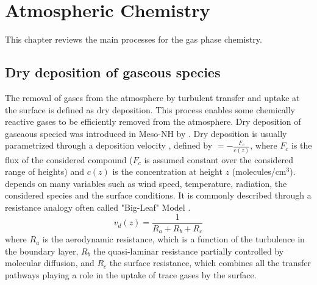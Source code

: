 %
%
%
\chapter{Atmospheric Chemistry}
\minitoc
%
This chapter reviews the main processes for the gas phase chemistry.

\section{Dry deposition of gaseous species}

The removal of gases from the atmosphere by turbulent transfer and uptake at
the surface is defined as dry deposition. This process enables some
chemically reactive gases to be efficiently removed from the atmosphere. 
Dry deposition of gaseaous specied was introduced in Meso-NH by 
\citet{Tulet2003}.
Dry deposition is usually parametrized through a deposition velocity \vd,
defined by \vd$=-\frac{F_c}{c(z)}$, where $F_c$ is the flux of the considered
compound ($F_c$ is assumed constant over the considered range of heights) and
$c(z)$ is the concentration at height $z$ (molecules/cm$^3$). \vd~ depends
on many variables such as wind speed, temperature, radiation, the considered
species and the surface conditions. It is commonly described
through a resistance analogy often called "Big-Leaf" Model 
\citep[e.g.][]{Wesely1977}.
\[
v_d(z)=\frac{1}{R_a+R_b+R_c}\]
where $R_a$ is the aerodynamic resistance, which is a function of the
turbulence 
in the boundary layer, $R_b$ the quasi-laminar resistance partially controlled
by molecular diffusion, and $R_c$ the surface
resistance, which combines all the transfer pathways playing a role in the
uptake of trace gases by the surface.

